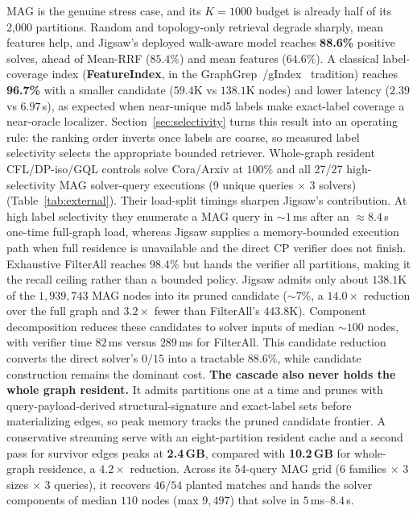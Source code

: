\documentclass[runningheads]{llncs}
\begin{document}
MAG is the genuine stress case, and its $K{=}1000$ budget is already half of its 2{,}000 partitions. Random and topology-only retrieval degrade sharply, mean features help, and Jigsaw's deployed walk-aware model reaches \textbf{88.6\%} positive solves, ahead of Mean-RRF ($85.4\%$) and mean features ($64.6\%$). A classical label-coverage index (\textbf{FeatureIndex}, in the GraphGrep~\cite{ref_graphgrep}/gIndex~\cite{ref_gindex} tradition) reaches \textbf{96.7\%} with a smaller candidate ($59.4$K vs $138.1$K nodes) and lower latency ($2.39$ vs $6.97$\,s), as expected when near-unique md5 labels make exact-label coverage a near-oracle localizer. Section~\ref{sec:selectivity} turns this result into an operating rule: the ranking order inverts once labels are coarse, so measured label selectivity selects the appropriate bounded retriever. Whole-graph resident CFL/DP-iso/GQL controls solve Cora/Arxiv at $100\%$ and all 27/27 high-selectivity MAG solver-query executions (9 unique queries $\times$ 3 solvers) (Table~\ref{tab:external}). Their load-split timings sharpen Jigsaw's contribution. At high label selectivity they enumerate a MAG query in ${\sim}1$\,ms after an ${\approx}8.4$\,s one-time full-graph load, whereas Jigsaw supplies a memory-bounded execution path when full residence is unavailable and the direct CP verifier does not finish. Exhaustive FilterAll reaches $98.4\%$ but hands the verifier all partitions, making it the recall ceiling rather than a bounded policy. Jigsaw admits only about $138.1$K of the $1{,}939{,}743$ MAG nodes into its pruned candidate ($\sim$7\%, a $14.0\times$ reduction over the full graph and $3.2\times$ fewer than FilterAll's $443.8$K). Component decomposition reduces these candidates to solver inputs of median ${\sim}100$ nodes, with verifier time $82$\,ms versus $289$\,ms for FilterAll. This candidate reduction converts the direct solver's $0/15$ into a tractable $88.6\%$, while candidate construction remains the dominant cost. \textbf{The cascade also never holds the whole graph resident.} It admits partitions one at a time and prunes with query-payload-derived structural-signature and exact-label sets before materializing edges, so peak memory tracks the pruned candidate frontier. A conservative streaming serve with an eight-partition resident cache and a second pass for survivor edges peaks at \textbf{2.4\,GB}, compared with \textbf{10.2\,GB} for whole-graph residence, a $4.2\times$ reduction. Across its 54-query MAG grid (6 families $\times$ 3 sizes $\times$ 3 queries), it recovers $46/54$ planted matches and hands the solver components of median $110$ nodes (max $9{,}497$) that solve in $5$\,ms--$8.4$\,s.
\end{document}

